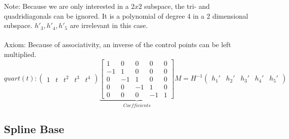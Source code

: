 \documentclass[a4paper,landscape]{report}
\begin{document}
Note: Because we are only interested in a $2x2$ subspace, the tri- and quadridiagonals can be ignored. It is a polynomial of degree 4 in a 2 dimensional subspace. $h'_{3},h'_{4},h'_{5}$ are irrelevant in this case.\\\\
Axiom: Because of associativity, an inverse of the control points can be left multiplied.
\begin{equation}
quart(t):
\begin{pmatrix}
1 & t & t^2 & t^3 & t^4
\end{pmatrix}
\underbrace{\begin{bmatrix}
1 & 0 & 0 & 0 & 0\\
-1 & 1 & 0 & 0 & 0\\
0 & -1 &1 & 0 & 0\\
0 & 0 & -1 & 1 & 0\\
0 & 0 & 0 & -1 & 1
\end{bmatrix}}_{Coefficients}
M
=
H^{-1}
\begin{pmatrix}
h_{1}' & h_{2}' & h_{3}' & h_{4}' & h_{5}'
\end{pmatrix}
\end{equation}

\iffalse
\subsection{Number of Variables}
Axiom: Within the bounds $[a,b]$ a combination of multiple $splines$ can occur. They are independent, $iff$ for all vectors there is a sum $g' +h'$\\\\
\begin{equation}
sum(t):
\begin{bmatrix}
1 & t & t^2\\
1 & u & u^2
\end{bmatrix}
\underbrace{CMH}_{}
=
\begin{pmatrix}
g_{1}' & g_{2}' & g_{3}'\\
h_{1}' & h_{2}' & h_{3}'
\end{pmatrix}
\end{equation}
Theorem: They are harmonic, hence there is a non-sparse separation.
\fi

\subsection{Spline Base}
\end{document}
